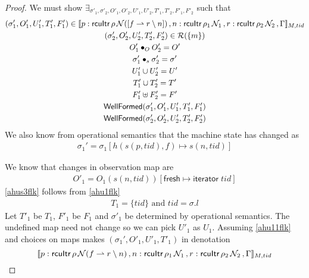 \begin{proof}
We must show $\exists_{\sigma'_1, \sigma'_2, O'_{1}, O'_{2}, U'_{1}, U'_{2}, T'_{1}, T'_{2}, F'_1, F'_2}$ such that
\begin{gather}\label{phu5flk}
\begin{aligned}
(\sigma_1',O'_{1},U'_{1}, T'_{1},F'_1)  \in \llbracket p:\textsf{rcuItr}\, \rho \, \mathcal{N}([f\rightharpoonup r \setminus n]) \, , n:\textsf{rcuItr}\, \rho_1 \, \mathcal{N}_1 \, , r:\textsf{rcuItr}\, \rho_2\, \mathcal{N}_2\, ,  \Gamma \rrbracket_{M,tid}
\end{aligned}
\\
\label{phu6flk}
(\sigma_2',O'_{2},U'_{2}, T'_{2}, F'_2) \in \mathcal{R}(\{m\})
\\
\label{phu7flk}
O'_{1} \bullet_{O} O'_{2} = O'
\\
\label{ahusigf'lk}
\sigma'_1 \bullet_s \sigma'_2 = \sigma' \\
\label{phu8flk}
U'_{1} \cup U'_{2} = U'
\\
\label{phu9flk}
T'_{1} \cup T'_{2} = T'
\\
\label{phuffflk}
F'_1 \uplus F'_2 = F'
\\
\label{phu10flk}
\textsf{WellFormed}(\sigma_1',O'_{1},U'_{1},T'_{1},F'_1) \\
\label{phu11flk}
\textsf{WellFormed}(\sigma_2',O'_{2},U'_{2},T'_{2},F'_2)
\end{gather}
We also know from operational semantics that the machine state has changed as
\begin{gather}\label{ahusflk}
\sigma_1' =  \sigma_1[h(s(p,tid),f ) \mapsto s(n,tid) ]
\end{gather}

We know that changes in observation map are
\begin{gather}\label{ahus1flk}
O'_1 =  O_1(s(n,tid))[\textsf{fresh} \mapsto \textsf{iterator}\;tid ]
\end{gather}
\ref{ahus3flk} follows from \ref{ahu1flk}
\begin{gather}\label{ahus3flk}
  T_1 = \{tid\} \text{ and } tid = \sigma.l
\end{gather}
Let $T'_1$ be $T_1$, $F'_1$ be $F_1$ and $\sigma'_1$ be determined by operational semantics. The undefined map need not change so we can pick $U'_1$ as $U_1$. Assuming \ref{ahu11flk} and choices on maps makes $(\sigma_1',O'_{1},U'_{1}, T'_{1})$ in denotation
\[\llbracket p:\textsf{rcuItr}\, \rho \, \mathcal{N}(f \rightharpoonup r \setminus n) \, , n:\textsf{rcuItr}\, \rho_1 \, \mathcal{N}_1 \, , r:\textsf{rcuItr}\,\rho_2\,\mathcal{N}_2\, ,  \Gamma \rrbracket_{M,tid}\]


\end{proof}
